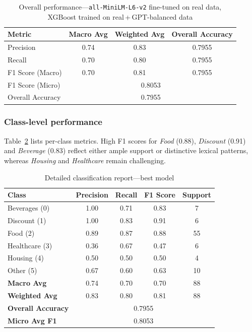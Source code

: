 \documentclass{SGGW-thesis-EN}
\begin{document}
\begin{table}
  \centering
  \caption{Overall performance—\texttt{all-MiniLM-L6-v2} fine-tuned on real data, XGBoost trained on real\,+\,GPT-balanced data}
  \label{tab:best_model_summary}
  \begin{tabularx}{\textwidth}{lccc}
    \toprule
    \textbf{Metric} & \textbf{Macro Avg} & \textbf{Weighted Avg} & \textbf{Overall Accuracy} \\
    \midrule
    Precision        & 0.74 & 0.83 & 0.7955 \\
    Recall           & 0.70 & 0.80 & 0.7955 \\
    F1 Score (Macro) & 0.70 & 0.81 & 0.7955 \\
    F1 Score (Micro) & \multicolumn{3}{c}{0.8053} \\
    Overall Accuracy & \multicolumn{3}{c}{0.7955} \\
    \bottomrule
  \end{tabularx}
\end{table}

\subsubsection*{Class-level performance}
Table~\ref{tab:best_model_report} lists per-class metrics.
High F1 scores for \emph{Food} (0.88), \emph{Discount} (0.91) and \emph{Beverage} (0.83) reflect either
ample support or distinctive lexical patterns, whereas \emph{Housing} and \emph{Healthcare} remain challenging.

\begin{table}
  \centering
  \caption{Detailed classification report—best model}
  \label{tab:best_model_report}
  \begin{tabularx}{\textwidth}{lcccc}
    \toprule
    \textbf{Class} & \textbf{Precision} & \textbf{Recall} & \textbf{F1 Score} & \textbf{Support} \\
    \midrule
    Beverages (0)  & 1.00 & 0.71 & 0.83 & 7  \\
    Discount  (1)  & 1.00 & 0.83 & 0.91 & 6  \\
    Food      (2)  & 0.89 & 0.87 & 0.88 & 55 \\
    Healthcare (3) & 0.36 & 0.67 & 0.47 & 6  \\
    Housing    (4) & 0.50 & 0.50 & 0.50 & 4  \\
    Other      (5) & 0.67 & 0.60 & 0.63 & 10 \\
    \midrule
    \textbf{Macro Avg}        & 0.74 & 0.70 & 0.70 & 88 \\
    \textbf{Weighted Avg}     & 0.83 & 0.80 & 0.81 & 88 \\
    \textbf{Overall Accuracy} & \multicolumn{4}{c}{0.7955} \\
    \textbf{Micro Avg F1}     & \multicolumn{4}{c}{0.8053} \\
    \bottomrule
  \end{tabularx}
\end{table}
\end{document}
